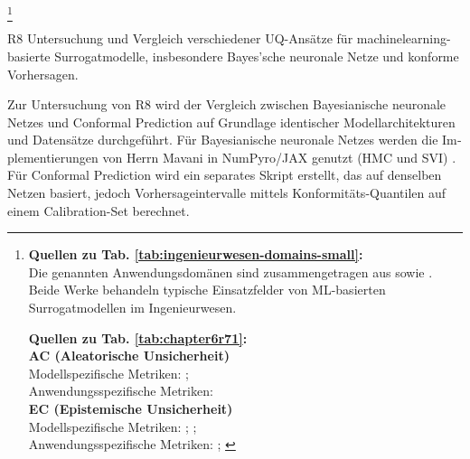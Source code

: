 \begin{otherlanguage}{ngerman}
\footnote{%

\begin{minipage}[t]{\textwidth}
\scriptsize
\textbf{Quellen zu Tab. \ref{tab:ingenieurwesen-domains-small}:}\\[0.5em]
Die genannten Anwendungsdomänen sind zusammengetragen aus \parencite{Gawlikowski2023} sowie \parencite{Ulmer2023}. Beide Werke behandeln typische Einsatzfelder von ML-basierten Surrogatmodellen im Ingenieurwesen. 
\end{minipage}%
\vspace{0.125em}
\begin{minipage}[t]{\textwidth}
\scriptsize
\textbf{Quellen zu Tab. \ref{tab:chapter6r71}:}\\[0.5em]
\textbf{AC (Aleatorische Unsicherheit)}\\
\quad Modellspezifische Metriken: \parencite[S.~224–226]{bishop2006pattern}; \parencite[Kap.~2]{rasmussen2006gaussian} \\
\quad Anwendungsspezifische Metriken: \parencite[S.~40–42]{bishop2006pattern} \\[0.5em]

\textbf{EC (Epistemische Unsicherheit)}\\
\quad Modellspezifische Metriken: \parencite[S.~40–42]{gal2016uncertainty}; \parencite{blundell2015weight}; \parencite{sensoy2018evidential} \\
\quad Anwendungsspezifische Metriken: \parencite[S.~233–235]{bishop2006pattern}; \parencite{ovadia2019can}
\end{minipage}%
}


\pagebreak


R8 Untersuchung und Vergleich verschiedener UQ-Ansätze für \gls{machinelearning}-basierte Surrogatmodelle, insbesondere Bayes'sche neuronale Netze und konforme Vorhersagen.

\newline
Zur Untersuchung von R8 wird der Vergleich zwischen \gls{Bayesianische neuronale Netze}s und \gls{Conformal Prediction} auf Grundlage identischer Modellarchitekturen und Datensätze durchgeführt. Für \gls{Bayesianische neuronale Netze}s werden die Implementierungen von Herrn Mavani in NumPyro/JAX genutzt (HMC und SVI) \parencite{nmavani2025}. Für \gls{Conformal Prediction} wird ein separates Skript erstellt, das auf denselben Netzen basiert, jedoch Vorhersageintervalle mittels Konformitäts-Quantilen auf einem Calibration-Set berechnet.


\end{otherlanguage}
